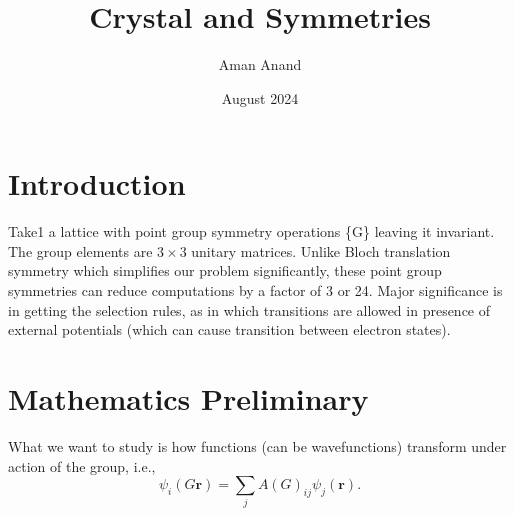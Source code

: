 \documentclass{article}
\title{Crystal and Symmetries}
\author{Aman Anand}
\date{August 2024}
\begin{document}
	
	\maketitle
	
	\section{Introduction}
	Take1 a lattice with point group symmetry operations \{G\} leaving it invariant. The group elements are $3 \times 3$ unitary matrices. Unlike Bloch translation symmetry which simplifies our problem significantly, these point group symmetries can reduce computations by a factor of 3 or 24. Major significance is in getting the selection rules, as in which transitions are allowed in presence of external potentials (which can cause transition between electron states). 
	
	\section{Mathematics Preliminary}
	What we want to study is how functions (can be wavefunctions) transform under action of the group, i.e.,
	\begin{equation}
		\psi_i (G\mathbf{r}) = \sum_j A(G)_{ij} \psi_j (\mathbf{r}) .
	\end{equation}
\end{document}
